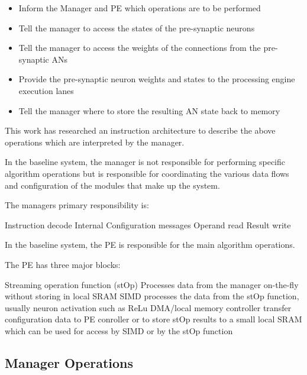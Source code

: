 \documentclass[journal]{IEEEtran}
\begin{document}
\begin{itemize}
    \item Inform the Manager and PE which operations are to be performed
    \item Tell the manager to access the states of the pre-synaptic neurons
    \item Tell the manager to access the weights of the connections from the pre-synaptic ANs
    \item Provide the pre-synaptic neuron weights and states to the processing engine execution lanes
    \item Tell the manager where to store the resulting AN state back to memory
\end{itemize}

This work has researched an instruction architecture to describe the above operations which are interpreted by the manager. 

In the baseline system, the manager is not responsible for performing specific algorithm operations but is responsible for coordinating the various data flows and configuration of the modules that make up the system.

The managers primary responsibility is:

\begin{outline}
    \1 Instruction decode
    \1 Internal Configuration messages
    \1 Operand read
    \1 Result write
\end{outline}

In the baseline system, the PE is responsible for the main algorithm operations.

The PE has three major blocks:

\begin{outline}
    \1 Streaming operation function (stOp)
      \2 Processes data from the manager on-the-fly without storing in local SRAM
    \1 SIMD
      \2 processes the data from the stOp function, usually neuron activation such as ReLu
    \1 DMA/local memory controller
      \2 transfer configuration data to PE conroller or to store stOp results to a small local SRAM which can be used for access by SIMD or by the stOp function
\end{outline}
\subsection{Manager Operations}
\label{sec:Manager Operations}
\end{document}
